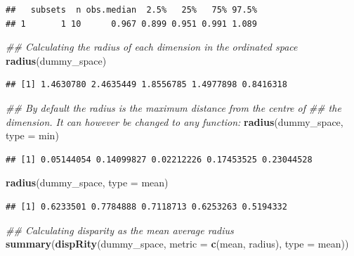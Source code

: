 \documentclass[
]{book}
\newenvironment{Shaded}{\begin{snugshade}}{\end{snugshade}}
\newcommand{\CommentTok}[1]{\textcolor[rgb]{0.56,0.35,0.01}{\textit{#1}}}
\newcommand{\DataTypeTok}[1]{\textcolor[rgb]{0.13,0.29,0.53}{#1}}
\newcommand{\KeywordTok}[1]{\textcolor[rgb]{0.13,0.29,0.53}{\textbf{#1}}}
\newcommand{\NormalTok}[1]{#1}
\begin{document}
\begin{verbatim}
##   subsets  n obs.median  2.5%   25%   75% 97.5%
## 1       1 10      0.967 0.899 0.951 0.991 1.089
\end{verbatim}

\begin{Shaded}
\begin{Highlighting}[]
\CommentTok{\#\# Calculating the radius of each dimension in the ordinated space}
\KeywordTok{radius}\NormalTok{(dummy\_space)}
\end{Highlighting}
\end{Shaded}

\begin{verbatim}
## [1] 1.4630780 2.4635449 1.8556785 1.4977898 0.8416318
\end{verbatim}

\begin{Shaded}
\begin{Highlighting}[]
\CommentTok{\#\# By default the radius is the maximum distance from the centre of}
\CommentTok{\#\# the dimension. It can however be changed to any function:}
\KeywordTok{radius}\NormalTok{(dummy\_space, }\DataTypeTok{type =}\NormalTok{ min)}
\end{Highlighting}
\end{Shaded}

\begin{verbatim}
## [1] 0.05144054 0.14099827 0.02212226 0.17453525 0.23044528
\end{verbatim}

\begin{Shaded}
\begin{Highlighting}[]
\KeywordTok{radius}\NormalTok{(dummy\_space, }\DataTypeTok{type =}\NormalTok{ mean)}
\end{Highlighting}
\end{Shaded}

\begin{verbatim}
## [1] 0.6233501 0.7784888 0.7118713 0.6253263 0.5194332
\end{verbatim}

\begin{Shaded}
\begin{Highlighting}[]
\CommentTok{\#\# Calculating disparity as the mean average radius}
\KeywordTok{summary}\NormalTok{(}\KeywordTok{dispRity}\NormalTok{(dummy\_space,}
                 \DataTypeTok{metric =} \KeywordTok{c}\NormalTok{(mean, radius),}
                 \DataTypeTok{type =}\NormalTok{ mean))}
\end{Highlighting}
\end{Shaded}
\end{document}
